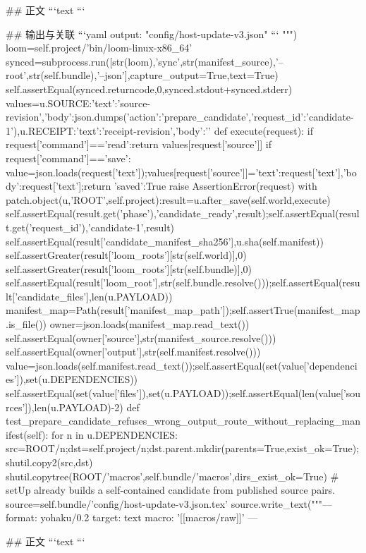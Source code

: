 ## 正文
```text
{}
```

## 输出与关联
```yaml
output: "config/host-update-v3.json"
```
""")
  loom=self.project/'bin/loom-linux-x86_64'
  synced=subprocess.run([str(loom),'sync',str(manifest_source),'--root',str(self.bundle),'--json'],capture_output=True,text=True)
  self.assertEqual(synced.returncode,0,synced.stdout+synced.stderr)
  values={u.SOURCE:{'text':'source-revision','body':json.dumps({'action':'prepare_candidate','request_id':'candidate-1'})},u.RECEIPT:{'text':'receipt-revision','body':'{}'}}
  def execute(request):
   if request['command']=='read':return values[request['source']]
   if request['command']=='save':
    value=json.loads(request['text']);values[request['source']]={'text':request['text'],'body':request['text']};return {'saved':True}
   raise AssertionError(request)
  with patch.object(u,'ROOT',self.project):result=u.after_save(self.world,execute)
  self.assertEqual(result.get('phase'),'candidate_ready',result);self.assertEqual(result.get('request_id'),'candidate-1',result)
  self.assertEqual(result['candidate_manifest_sha256'],u.sha(self.manifest))
  self.assertGreater(result['loom_roots'][str(self.world)],0)
  self.assertGreater(result['loom_roots'][str(self.bundle)],0)
  self.assertEqual(result['loom_root'],str(self.bundle.resolve()));self.assertEqual(result['candidate_files'],len(u.PAYLOAD))
  manifest_map=Path(result['manifest_map_path']);self.assertTrue(manifest_map.is_file())
  owner=json.loads(manifest_map.read_text())
  self.assertEqual(owner['source'],str(manifest_source.resolve()))
  self.assertEqual(owner['output'],str(self.manifest.resolve()))
  value=json.loads(self.manifest.read_text());self.assertEqual(set(value['dependencies']),set(u.DEPENDENCIES))
  self.assertEqual(set(value['files']),set(u.PAYLOAD));self.assertEqual(len(value['sources']),len(u.PAYLOAD)-2)
 def test_prepare_candidate_refuses_wrong_output_route_without_replacing_manifest(self):
  for n in u.DEPENDENCIES:
   src=ROOT/n;dst=self.project/n;dst.parent.mkdir(parents=True,exist_ok=True);shutil.copy2(src,dst)
  shutil.copytree(ROOT/'macros',self.bundle/'macros',dirs_exist_ok=True)
  # setUp already builds a self-contained candidate from published source pairs.
  source=self.bundle/'config/host-update-v3.json.tex'
  source.write_text("""---
format: yohaku/0.2
target: text
macro: '[[macros/raw]]'
---

## 正文
```text
{}
```

